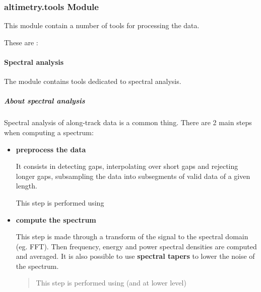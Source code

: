 \documentclass[letterpaper,10pt,english]{sphinxmanual}
\begin{document}
\subsubsection{altimetry.tools Module}
\label{altimetry.tools:altimetry-tools-module}\label{altimetry.tools::doc}
This module contain a number of tools for processing the data.

These are :


\paragraph{Spectral analysis}
\label{altimetry.tools.spectrum:spectral-tools}\label{altimetry.tools.spectrum:spectral-analysis}\label{altimetry.tools.spectrum::doc}
The {\hyperref[altimetry.tools.spectrum:module-altimetry.tools.spectrum]{}} module contains tools dedicated to spectral analysis.


\subparagraph{About spectral analysis}
\label{altimetry.tools.spectrum:about-spectral-analysis}
Spectral analysis of along-track data is a common thing. There are 2 main steps when computing a spectrum:
\begin{itemize}
\item {} 
\textbf{preprocess the data}

It consists in detecting gaps, interpolating over short gaps and rejecting longer gaps, subsampling the data into subsegments of valid data of a given length.

This step is performed using {\hyperref[altimetry.tools.spectrum:altimetry.tools.spectrum.preprocess]{}}

\item {} 
\textbf{compute the spectrum}

This step is made through a transform of the signal to the spectral domain (eg. FFT). Then frequency, energy and power spectral densities are computed and averaged. It is also possible to use \textbf{spectral tapers} to lower the noise of the spectrum.
\begin{quote}

This step is performed using {\hyperref[altimetry.tools.spectrum:altimetry.tools.spectrum.spectral_analysis]{}} (and {\hyperref[altimetry.tools.spectrum:altimetry.tools.spectrum.get_spec]{}} at lower level)
\end{quote}

\end{itemize}
\end{document}
